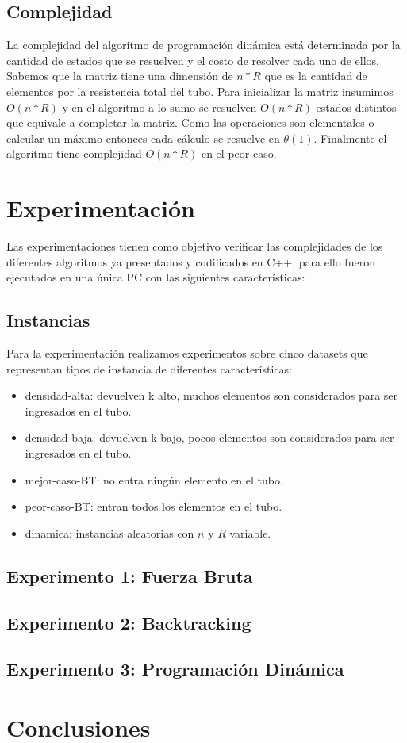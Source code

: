 \documentclass[10pt,a4paper]{article}
\begin{document}
\subsection{Complejidad}
La complejidad del algoritmo de programación dinámica está determinada por la cantidad de estados que se resuelven y el costo de resolver cada uno de ellos.
Sabemos que la matriz tiene una dimensión de $n * R$ que es la cantidad de elementos por la resistencia total del tubo. Para inicializar la matriz insumimos $O(n * R)$ y en el algoritmo a lo sumo se resuelven $O(n * R)$ estados distintos que equivale a completar la matriz. Como las operaciones son elementales o calcular un máximo entonces cada cálculo se resuelve en $\theta(1)$. Finalmente el algoritmo tiene complejidad $O(n * R)$ en el peor caso.

\section{Experimentación} \label{sec:experimentacion}
Las experimentaciones tienen como objetivo verificar las complejidades de los diferentes algoritmos ya presentados y codificados en C++, para ello fueron ejecutados en una única PC con las siguientes características:

\subsection{Instancias}
Para la experimentación realizamos experimentos sobre cinco datasets que representan tipos de instancia de diferentes características:
\begin{itemize}
	\item densidad-alta: devuelven k alto, muchos elementos son considerados para ser ingresados en el tubo.
	\item densidad-baja: devuelven k bajo, pocos elementos son considerados para ser ingresados en el tubo.
	\item mejor-caso-BT: no entra ningún elemento en el tubo.
	\item peor-caso-BT: entran todos los elementos en el tubo.
	\item dinamica: instancias aleatorias con $n$ y $R$ variable.
\end{itemize}
% 
%
%
%
%
%
%
%
%
%
%
%
%
%
%
%
%
%
%
%
%
%
%
%
%
%
%
%
%
%
%
%
%
%
\subsection{Experimento 1: Fuerza Bruta}

\subsection{Experimento 2: Backtracking}

\subsection{Experimento 3: Programación Dinámica}

\section{Conclusiones} \label{sec:conclusiones}

\newpage

\end{document}
